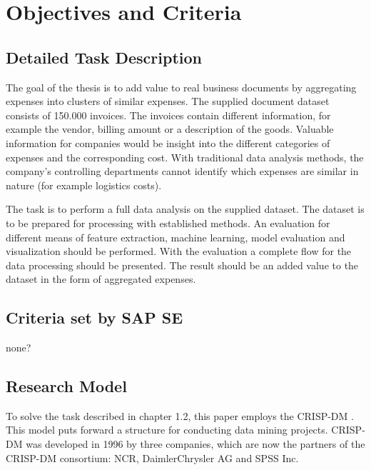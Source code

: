 \chapter{Objectives and Criteria}
\section{Detailed Task Description}
The goal of the thesis is to add value to real business documents by aggregating expenses into clusters of similar expenses. The supplied document dataset consists of 150.000 invoices. The invoices contain different information, for example the vendor, billing amount or a description of the goods. Valuable information for companies would be insight into the different categories of expenses and the corresponding cost. With traditional data analysis methods, the company’s controlling departments cannot identify which expenses are similar in nature (for example logistics costs). 

The task is to perform a full data analysis on the supplied dataset. The dataset is to be prepared for processing with established methods. An evaluation for different means of feature extraction, machine learning, model evaluation and visualization should be performed. With the evaluation a complete flow for the data processing should be presented. The result should be an added value to the dataset in the form of aggregated expenses.

\section{Criteria set by SAP SE}
none?

\section{Research Model}
To solve the task described in chapter 1.2, this paper employs the \ac{CRISP-DM} \cite{CRISPDM2000}. This model puts forward a structure for conducting data mining projects. \ac{CRISP-DM} was developed in 1996 by three companies, which are now the partners of the \ac{CRISP-DM} consortium: NCR, DaimlerChrysler AG and SPSS Inc. 

